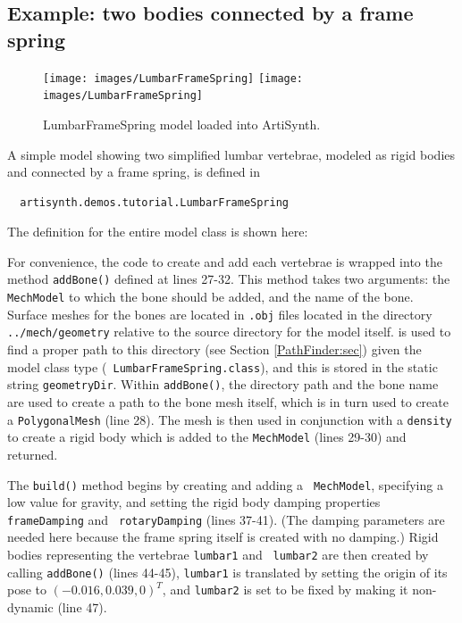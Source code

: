 \subsection{Example: two bodies connected by a frame spring}
\label{LumbarFrameSpring:sec}

\begin{figure}[ht]
\begin{center}
\iflatexml
 \texttt{[image: images/LumbarFrameSpring]}
\else
 \texttt{[image: images/LumbarFrameSpring]}
\fi
\end{center}
\caption{LumbarFrameSpring model loaded into ArtiSynth.}
\label{LumbarFrameSpring:fig}
\end{figure}

A simple model showing two simplified lumbar vertebrae, modeled as
rigid bodies and connected by a frame spring, is defined in
%
\begin{verbatim}
  artisynth.demos.tutorial.LumbarFrameSpring
\end{verbatim}
%
The definition for the entire model class is shown here:
\lstset{numbers=left}

\lstset{numbers=none}

For convenience, the code to create and add each vertebrae is wrapped
into the method {\tt addBone()} defined at lines 27-32. This method
takes two arguments: the {\tt MechModel} to which the bone should be
added, and the name of the bone. Surface meshes for the bones are
located in {\tt .obj} files located in the directory {\tt
../mech/geometry} relative to the source directory for the model
itself.
is used to find a proper path to this directory (see Section
\ref{PathFinder:sec}) given the model class type ({\tt
LumbarFrameSpring.class}), and this is stored in the static string
{\tt geometryDir}. Within {\tt addBone()}, the directory path and the
bone name are used to create a path to the bone mesh itself, which is
in turn used to create a {\tt PolygonalMesh} (line 28). The mesh is
then used in conjunction with a {\tt density} to create a rigid body
which is added to the {\tt MechModel} (lines 29-30) and returned.

The {\tt build()} method begins by creating and adding a {\tt
MechModel}, specifying a low value for gravity, and setting the rigid
body damping properties {\tt frameDamping} and {\tt
rotaryDamping} (lines 37-41). (The damping parameters are needed
here because the frame spring itself is created with no damping.)
Rigid bodies representing the vertebrae {\tt lumbar1} and {\tt
lumbar2} are then created by calling {\tt addBone()} (lines 44-45),
{\tt lumbar1} is translated by setting the origin of its pose to
$(-0.016, 0.039, 0)^T$, and {\tt lumbar2} is set to be fixed by making
it non-dynamic (line 47).

